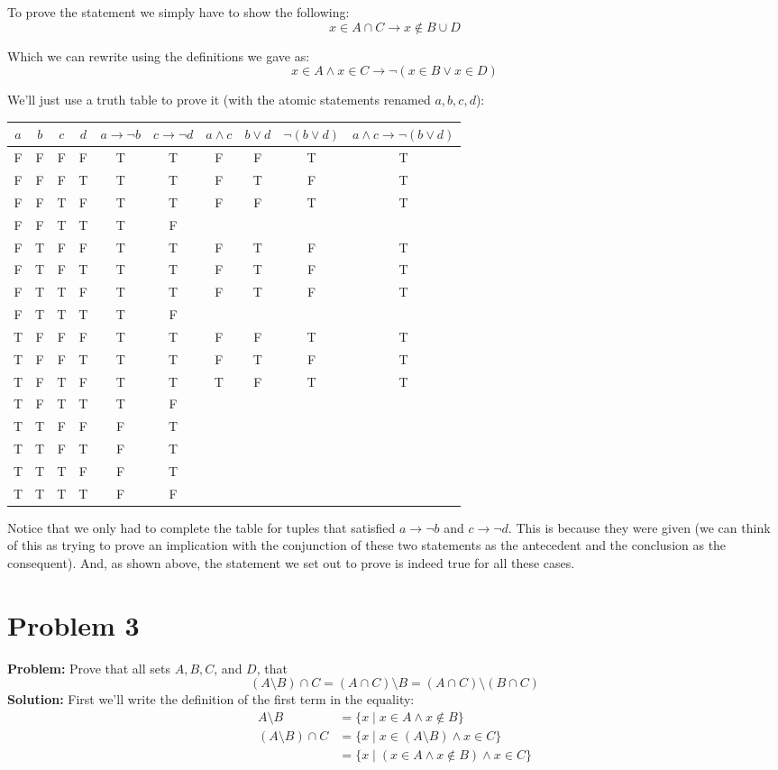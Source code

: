 \documentclass{article}
\begin{document}
To prove the statement we simply have to show the following:
$$x\in A\cap C\rightarrow x\not\in B\cup D$$

Which we can rewrite using the definitions we gave as:
$$x\in A\wedge x\in C\rightarrow \neg(x\in B\vee x\in D)$$

We'll just use a truth table to prove it (with the atomic statements renamed $a,b,c,d$):
\begin{center}
\begin{tabular}{c|c|c|c|c|c|c|c|c|c}
$a$ & $b$ & $c$ & $d$ & $a\rightarrow \neg b$ & $c\rightarrow \neg d$  & $a\wedge c$ & $b\vee d$ & $\neg(b\vee d)$ & $a\wedge c\rightarrow \neg(b\vee d)$\\
\hline
F&F&F&F &T&T  &F&F&T&T\\
F&F&F&T &T&T  &F&T&F&T\\
F&F&T&F &T&T  &F&F&T&T\\
F&F&T&T &T&F  &&&&\\
F&T&F&F &T&T  &F&T&F&T\\
F&T&F&T &T&T  &F&T&F&T\\
F&T&T&F &T&T  &F&T&F&T\\
F&T&T&T &T&F  &&&&\\
T&F&F&F &T&T  &F&F&T&T\\
T&F&F&T &T&T  &F&T&F&T\\
T&F&T&F &T&T  &T&F&T&T\\
T&F&T&T &T&F  &&&&\\
T&T&F&F &F&T  &&&&\\
T&T&F&T &F&T  &&&&\\
T&T&T&F &F&T  &&&&\\
T&T&T&T &F&F  &&&&\\
\end{tabular}
\end{center}

Notice that we only had to complete the table for tuples that satisfied $a\rightarrow \neg b$ and $c\rightarrow \neg d$. This is because they were given (we can think of this as trying to prove an implication with the conjunction of these two statements as the antecedent and the conclusion as the consequent). And, as shown above, the statement we set out to prove is indeed true for all these cases.

\section*{Problem 3}
\textbf{Problem:} Prove that all sets $A,B,C$, and $D$, that
$$(A\setminus B)\cap C=(A\cap C)\setminus B=(A\cap C)\setminus(B\cap C)$$
\textbf{Solution:} First we'll write the definition of the first term in the equality:
\begin{align*}
  A\setminus B&=\{x\mid x\in A\wedge x\not\in B\}\\
  (A\setminus B)\cap C&=\{x\mid x\in (A\setminus B) \wedge x\in C\}\\
  &=\{x\mid (x\in A\wedge x\not\in B) \wedge x\in C\}
\end{align*}
\end{document}
